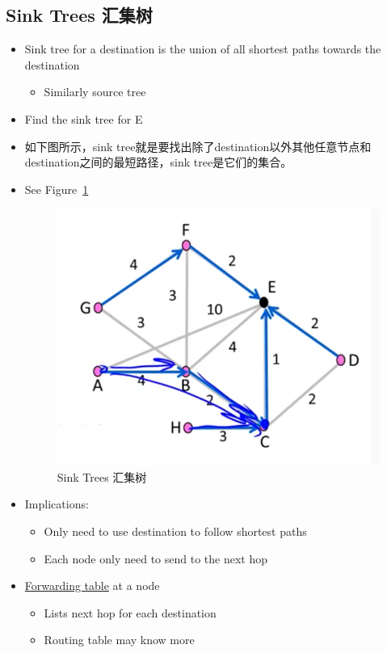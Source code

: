 \documentclass[12pt]{ctexart}   %
\begin{document}
	\subsection{Sink Trees 汇集树}
	\begin{itemize}
		\item Sink tree for a destination is the union of all shortest paths towards the destination
		\begin{itemize}
			\item Similarly source tree
		\end{itemize}
		
		\item Find the sink tree for E
		\item 如下图所示，sink tree就是要找出除了destination以外其他任意节点和destination之间的最短路径，sink tree是它们的集合。
		\item See Figure~\ref{fig:5-2-4}
			
		\begin{figure}[h!] %
		\centering
		 \includegraphics[scale=0.7]{images/5-2-4}
		\caption{ Sink Trees 汇集树 }
		 \label{fig:5-2-4}
		 \end{figure}
		
		\item Implications:
		\begin{itemize}
			\item Only need to use destination to follow shortest paths
			\item Each node only need to send to the next hop
		\end{itemize}
		
		\item \underline{Forwarding table} at a node
		\begin{itemize}
			\item Lists next hop for each destination
			\item Routing table may know more
		\end{itemize}
	\end{itemize}
\end{document}
